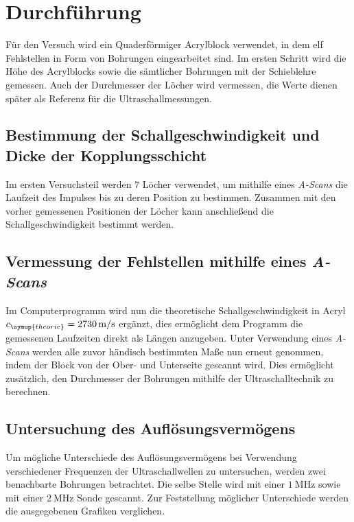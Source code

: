 \section{Durchführung}
\label{sec:Durchführung}

Für den Versuch wird ein Quaderförmiger Acrylblock verwendet, in dem elf Fehlstellen in Form von Bohrungen eingearbeitet sind.
Im ersten Schritt wird die Höhe des Acrylblocks sowie die sämtlicher Bohrungen mit der Schieblehre gemessen.
Auch der Durchmesser der Löcher wird vermessen, die Werte dienen später als Referenz für die Ultraschallmessungen.

\subsection{Bestimmung der Schallgeschwindigkeit und Dicke der Kopplungsschicht}
Im ersten Versuchsteil werden 7 Löcher verwendet, um mithilfe eines \textit{A-Scans} die Laufzeit des Impulses
bis zu deren Position zu bestimmen. Zusammen mit den vorher gemessenen Positionen der Löcher kann anschließend
die Schallgeschwindigkeit bestimmt werden.

\subsection{Vermessung der Fehlstellen mithilfe eines \textit{A-Scans}}
\label{sec:arschscan}
Im Computerprogramm wird nun die theoretische Schallgeschwindigkeit in Acryl
$c_{\symup{theorie}}=\qty{2730}{\metre\per\second}$ \cite{c_Acryl} ergänzt, dies ermöglicht dem Programm
die gemessenen Laufzeiten direkt als Längen anzugeben.
Unter Verwendung eines \textit{A-Scans} werden alle zuvor händisch bestimmten Maße nun erneut genommen,
indem der Block von der Ober- und Unterseite gescannt wird.
Dies ermöglicht zusätzlich, den Durchmesser der Bohrungen mithilfe der Ultraschalltechnik zu berechnen.

\subsection{Untersuchung des Auflösungsvermögens}
Um mögliche Unterschiede des Auflösungsvermögens bei Verwendung verschiedener Frequenzen der Ultraschallwellen
zu untersuchen, werden zwei benachbarte Bohrungen betrachtet. Die selbe Stelle wird mit einer $\qty{1}{\mega\hertz}$
sowie mit einer $\qty{2}{\mega\hertz}$ Sonde gescannt. Zur Feststellung möglicher Unterschiede werden die ausgegebenen
Grafiken verglichen.

